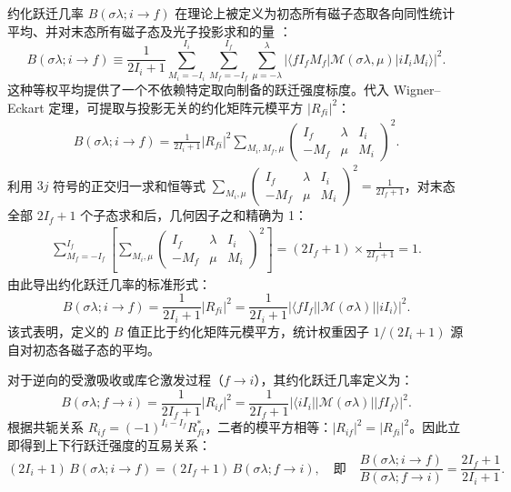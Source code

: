 约化跃迁几率 $B(\sigma\lambda; i \to f)$ 在理论上被定义为初态所有磁子态取各向同性统计平均、并对末态所有磁子态及光子投影求和的量 \cite{book-suhonen-from-nucleons-to-nucleus}：
\begin{equation}\label{eq:2-1-12}
B(\sigma\lambda; i \to f) \equiv \frac{1}{2I_i + 1} \sum_{M_i=-I_i}^{I_i} \sum_{M_f=-I_f}^{I_f} \sum_{\mu=-\lambda}^\lambda |\langle f I_f M_f | \mathcal{M}(\sigma\lambda, \mu) | i I_i M_i \rangle|^2.
\end{equation}
这种等权平均提供了一个不依赖特定取向制备的跃迁强度标度。代入 Wigner–Eckart 定理，可提取与投影无关的约化矩阵元模平方 $|R_{fi}|^2$：
\begin{align}\label{eq:2-1-13}
B(\sigma\lambda; i \to f) = \frac{1}{2I_i + 1} |R_{fi}|^2 \sum_{M_i, M_f, \mu} \begin{pmatrix} I_f & \lambda & I_i \\ -M_f & \mu & M_i \end{pmatrix}^2.
\end{align}
利用 $3j$ 符号的正交归一求和恒等式 $\sum_{M_i, \mu} \begin{pmatrix} I_f & \lambda & I_i \\ -M_f & \mu & M_i \end{pmatrix}^2 = \frac{1}{2I_f + 1}$，对末态全部 $2I_f + 1$ 个子态求和后，几何因子之和精确为 1：
\begin{align}\label{eq:2-1-14}
\sum_{M_f=-I_f}^{I_f} \left[ \sum_{M_i, \mu} \begin{pmatrix} I_f & \lambda & I_i \\ -M_f & \mu & M_i \end{pmatrix}^2 \right] = (2I_f + 1) \times \frac{1}{2I_f + 1} = 1.
\end{align}
由此导出约化跃迁几率的标准形式：
\begin{equation}\label{eq:2-1-15}
B(\sigma\lambda; i \to f) = \frac{1}{2I_i + 1} |R_{fi}|^2 = \frac{1}{2I_i + 1} |\langle f I_f || \mathcal{M}(\sigma\lambda) || i I_i \rangle|^2.
\end{equation}
该式表明，定义的 $B$ 值正比于约化矩阵元模平方，统计权重因子 $1/(2I_i + 1)$ 源自对初态各磁子态的平均。

对于逆向的受激吸收或库仑激发过程（$f \to i$），其约化跃迁几率定义为：
\begin{equation}\label{eq:2-1-16}
B(\sigma\lambda; f \to i) = \frac{1}{2I_f + 1} |R_{if}|^2 = \frac{1}{2I_f + 1} |\langle i I_i || \mathcal{M}(\sigma\lambda) || f I_f \rangle|^2.
\end{equation}
根据共轭关系 $R_{if} = (-1)^{I_i - I_f} R_{fi}^*$，二者的模平方相等：$|R_{if}|^2 = |R_{fi}|^2$。因此立即得到上下行跃迁强度的互易关系：
\begin{equation}\label{eq:2-1-17}
(2I_i + 1) \, B(\sigma\lambda; i \to f) = (2I_f + 1) \, B(\sigma\lambda; f \to i), \quad \text{即} \quad \frac{B(\sigma\lambda; i \to f)}{B(\sigma\lambda; f \to i)} = \frac{2I_f + 1}{2I_i + 1}.
\end{equation}

